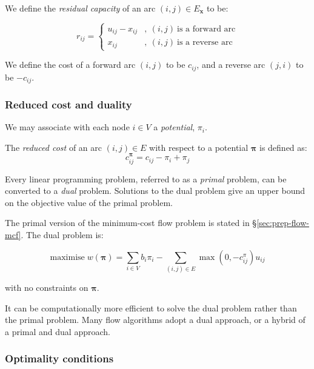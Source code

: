 We define the \emph{residual capacity} of an arc $(i,j)\in E_{\mathbf{x}}$
to be:

\begin{equation}
r_{ij}=\begin{cases}
u_{ij}-x_{ij} & ,\:(i,j)\:\mbox{is a forward arc}\\
x_{ij} & ,\:(i,j)\:\mbox{is a reverse arc}
\end{cases}
\end{equation}

We define the cost of a forward arc $(i,j)$ to be $c_{ij}$, and
a reverse arc $(j,i)$ to be $-c_{ij}$.


\subsubsection{Reduced cost and duality} \label{sec:prep-flow-rc-and-dual}

We may associate with each node $i\in V$ a \emph{potential}, $\pi_{i}$.

\begin{defn} \label{defn:reduced-costs}
The \emph{reduced cost} of an arc $(i,j)\in E$ with respect to a
potential $\boldsymbol{\pi}$ is defined as:
\begin{equation}
c_{ij}^{\boldsymbol{\pi}}=c_{ij}-\pi_{i}+\pi_{j}
\end{equation}
\end{defn}

Every linear programming problem, referred to as a \emph{primal} problem,
can be converted to a \emph{dual} problem. Solutions to the dual problem
give an upper bound on the objective value of the primal problem.

The primal version of the minimum-cost flow problem is stated in \S\ref{sec:prep-flow-mcf}. The dual problem is:

\begin{equation}
\mathrm{maximise}\; w(\boldsymbol{\pi})=\sum_{i\in V}b_{i}\pi_{i}-\sum_{(i,j)\in E}\max\left(0,-c_{ij}^{\pi}\right)u_{ij}
\end{equation}

with no constraints on $\boldsymbol{\pi}$.

It can be computationally more efficient to solve the dual problem
rather than the primal problem. Many flow algorithms adopt a dual
approach, or a hybrid of a primal and dual approach.

\subsubsection{Optimality conditions} \label{prep:flow-optimality}

